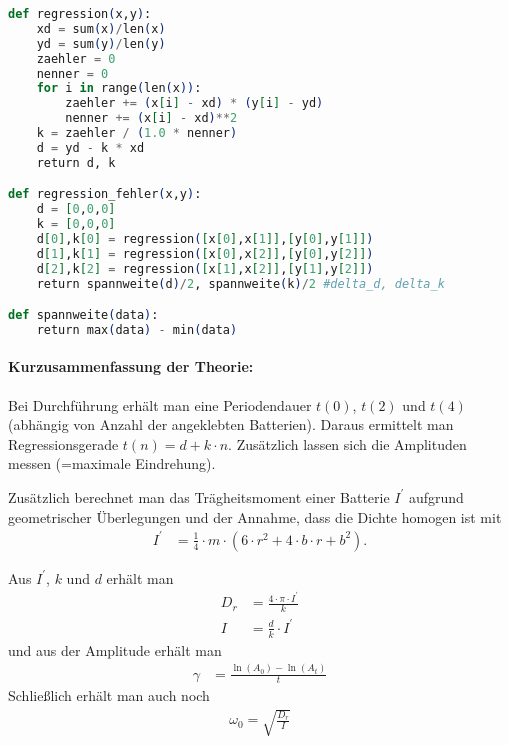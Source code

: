 \documentclass{article}
\begin{document}

\begin{lstlisting}[language=elixir, caption={Formel zur Berechnung der Regression.},captionpos=b, label=lst:test]
def regression(x,y):
    xd = sum(x)/len(x)
    yd = sum(y)/len(y)
    zaehler = 0
    nenner = 0
    for i in range(len(x)):
        zaehler += (x[i] - xd) * (y[i] - yd)
        nenner += (x[i] - xd)**2
    k = zaehler / (1.0 * nenner)
    d = yd - k * xd
    return d, k

def regression_fehler(x,y):
    d = [0,0,0]
    k = [0,0,0]
    d[0],k[0] = regression([x[0],x[1]],[y[0],y[1]])
    d[1],k[1] = regression([x[0],x[2]],[y[0],y[2]])
    d[2],k[2] = regression([x[1],x[2]],[y[1],y[2]])
    return spannweite(d)/2, spannweite(k)/2 #delta_d, delta_k

def spannweite(data):
    return max(data) - min(data)
\end{lstlisting}




\paragraph{Kurzusammenfassung der Theorie:}

Bei Durchführung erhält man eine Periodendauer $t(0)$, $t(2)$ und $t(4)$ (abhängig von Anzahl der angeklebten Batterien). Daraus ermittelt man Regressionsgerade $t(n) = d + k\cdot n$. Zusätzlich lassen sich die Amplituden messen (=maximale Eindrehung).

Zusätzlich berechnet man das Trägheitsmoment einer Batterie $I^\prime$ aufgrund geometrischer Überlegungen und der Annahme, dass die Dichte homogen ist mit
\begin{align}
I^\prime &= \frac{1}{4} \cdot m \cdot \left( 6\cdot r^2 + 4\cdot b \cdot r + b^2\right).
\end{align}

Aus $I^\prime$, $k$ und $d$ erhält man
\begin{align}
D_r &= \frac{4\cdot\pi\cdot I^\prime}{k} \\
I &= \frac{d}{k}\cdot I^\prime
\end{align}
und aus der Amplitude erhält man
\begin{align}
\gamma &= \frac{\ln(A_0) - \ln(A_t)}{t}
\end{align}
Schließlich erhält man auch noch 
\begin{align}
\omega_0 = \sqrt{\frac{D_r}{I}}
\end{align}
\end{document}
